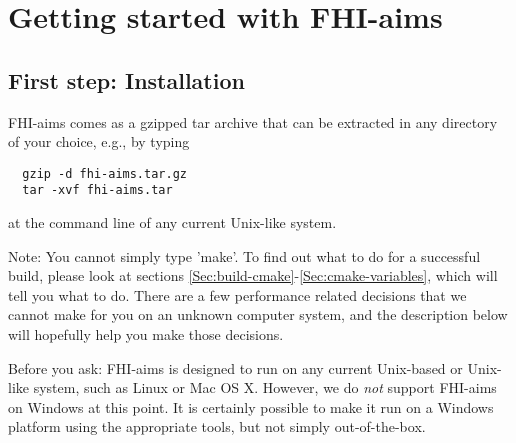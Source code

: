 \chapter{Getting started with FHI-aims}
\label{Ch:quickstart}

\section{First step: Installation}
\label{Sec:installation}

FHI-aims comes as a gzipped tar archive that can be extracted in any directory
of your choice, e.g., by typing

\begin{verbatim}
  gzip -d fhi-aims.tar.gz
  tar -xvf fhi-aims.tar
\end{verbatim}

at the
command line of any current Unix-like system.

Note: You cannot simply type 'make'. To find out what to do for a
successful build, please look at sections
\ref{Sec:build-cmake}-\ref{Sec:cmake-variables}, which will tell you
what to do. There are a few performance related decisions that we
cannot make for you on an unknown computer system, and the description
below will hopefully help you make those decisions.

\begin{center}
  \parbox[c]{0.8\textwidth}
  {\small
    Before you ask: FHI-aims is designed to run on any current Unix-based or
    Unix-like system, such as Linux or Mac OS
    X. However, we do \emph{not} support FHI-aims on Windows at this point. It
    is certainly possible to make it run on a Windows platform using the
    appropriate tools, but not simply out-of-the-box. 
  } 
\end{center}

